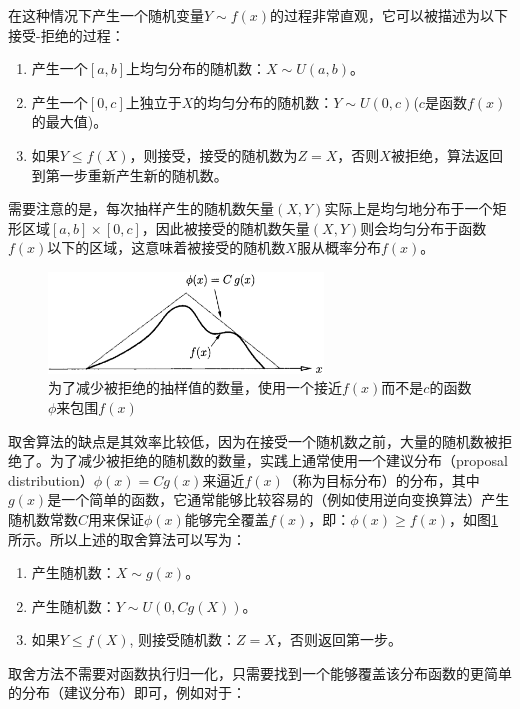 在这种情况下产生一个随机变量$Y\sim f(x)$的过程非常直观，它可以被描述为以下接受-拒绝的过程：

\begin{enumerate}
	\item 产生一个$[a,b]$上均匀分布的随机数：$X\sim U(a,b)$。
	\item 产生一个$[0,c]$上独立于$X$的均匀分布的随机数：$Y\sim U(0,c)$($c$是函数$f(x)$的最大值)。 
	\item 如果$Y\leq f(X)$，则接受，接受的随机数为$Z=X$，否则$X$被拒绝，算法返回到第一步重新产生新的随机数。
\end{enumerate}

需要注意的是，每次抽样产生的随机数矢量$(X,Y)$实际上是均匀地分布于一个矩形区域$[a,b]\times [0,c]$，因此被接受的随机数矢量$(X,Y)$则会均匀分布于函数$f(x)$以下的区域，这意味着被接受的随机数$X$服从概率分布$f(x)$。

\begin{figure}
\sidecaption
	\includegraphics[width=0.65\textwidth]{figures/mc/mc-7}
	\caption{为了减少被拒绝的抽样值的数量，使用一个接近$f(x)$而不是$c$的函数$\phi$来包围$f(x)$}
	\label{f:mc-rejection-generalized}
\end{figure}

取舍算法的缺点是其效率比较低，因为在接受一个随机数之前，大量的随机数被拒绝了。为了减少被拒绝的随机数的数量，实践上通常使用一个建议分布（proposal distribution）$\phi (x)=Cg(x)$来逼近$f(x)$（称为目标分布）的分布，其中$g(x)$是一个简单的函数，它通常能够比较容易的（例如使用逆向变换算法）产生随机数常数$C$用来保证$\phi (x)$能够完全覆盖$f(x)$，即：$\phi (x)\geq f(x)$，如图\ref{f:mc-rejection-generalized}所示。所以上述的取舍算法可以写为：

\begin{enumerate}
	\item 产生随机数：$X\sim g(x)$。
	\item 产生随机数：$Y\sim U(0,Cg(X))$。
	\item 如果$Y\leq f(X)$, 则接受随机数：$Z=X$，否则返回第一步。 
\end{enumerate}

取舍方法不需要对函数执行归一化，只需要找到一个能够覆盖该分布函数的更简单的分布（建议分布）即可，例如对于：

